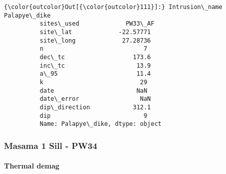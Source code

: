 \documentclass{article}
\begin{document}
            \begin{Verbatim}[commandchars=\\\{\}]
{\color{outcolor}Out[{\color{outcolor}111}]:} Intrusion\_name    Palapye\_dike
          sites\_used             PW33\_AF
          site\_lat             -22.57771
          site\_long             27.28736
          n                            7
          dec\_tc                   173.6
          inc\_tc                    13.9
          a\_95                      11.4
          k                           29
          date                       NaN
          date\_error                 NaN
          dip\_direction            312.1
          dip                          9
          Name: Palapye\_dike, dtype: object
\end{Verbatim}
        
    \subsubsection{Masama 1 Sill - PW34}\label{masama-1-sill---pw34}

    \paragraph{Thermal demag}\label{thermal-demag}
\end{document}
